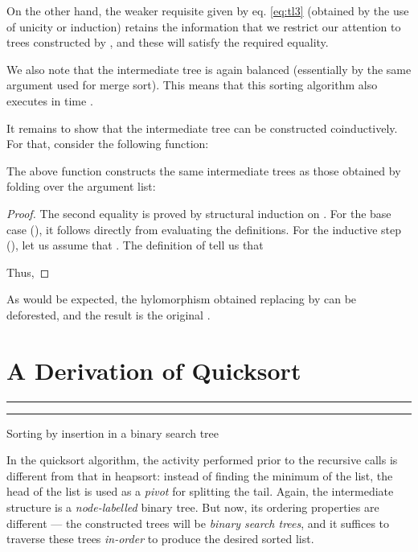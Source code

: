 \documentclass[a4paper,11pt]{llncs}
\begin{document}
\noindent On the other hand, the weaker requisite given by
eq. \ref{eq:tl3} (obtained by the use of unicity or induction) retains
the information that we restrict our attention to trees constructed by
, and these will satisfy the required equality.

We also note that the intermediate tree is again balanced (essentially
by the same argument used for merge sort). This means that this
sorting algorithm also executes in time .

It remains to show that the intermediate tree can be constructed
coinductively. For that, consider the following function:






\begin{proposition}
  \label{prop:buildH-unfold}
  The above function constructs the same intermediate trees as those
  obtained by folding over the argument list:
  
\end{proposition}
\begin{proof}


The second equality is proved by structural induction on .
For the base case (), it follows directly from evaluating the
definitions. For the inductive step (),
let us assume that . The definition of 
tell us that

Thus,

\end{proof}


As would be expected, the hylomorphism obtained replacing  by
 can be deforested, and the result is the original
.







\section{A Derivation of Quicksort}
\label{sec:deriv-quick-sort}


\begin{table}[tb]
\hrule

\hrule
\caption{Sorting by insertion in a binary search tree}
\label{tab:sortiBST}
\end{table}

In the quicksort algorithm, the activity performed prior to the
recursive calls is different from that in heapsort: instead of finding
the minimum of the list, the head of the list is used as a
\emph{pivot} for splitting the tail. Again, the intermediate structure
is a \emph{node-labelled} binary tree. But now, its ordering
properties are different --- the constructed trees will be
\emph{binary search trees}, and it suffices to traverse these trees
\emph{in-order} to produce the desired sorted list.
\end{document}
